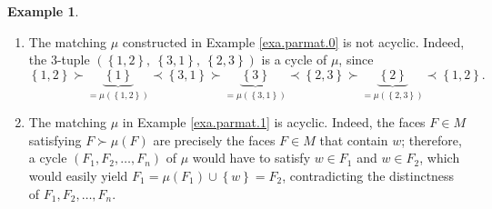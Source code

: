 \documentclass[12pt]{amsart}
\theoremstyle{definition}
\newtheorem{example}[theorem]{Example}
\begin{document}
\begin{example}
\ \ 

\begin{enumerate}
\item[(a)] The matching $\mu$ constructed in Example \ref{exa.parmat.0} is not
acyclic. Indeed, the $3$-tuple $\left(  \left\{  1,2\right\}  ,\ \left\{
3,1\right\}  ,\ \left\{  2,3\right\}  \right)  $ is a cycle of $\mu$, since%
\[
\left\{  1,2\right\}  \succ\underbrace{\left\{  1\right\}  }_{=\mu\left(
\left\{  1,2\right\}  \right)  }\prec\left\{  3,1\right\}  \succ
\underbrace{\left\{  3\right\}  }_{=\mu\left(  \left\{  3,1\right\}  \right)
}\prec\left\{  2,3\right\}  \succ\underbrace{\left\{  2\right\}  }%
_{=\mu\left(  \left\{  2,3\right\}  \right)  }\prec\left\{  1,2\right\}  .
\]


\item[(b)] The matching $\mu$ in Example \ref{exa.parmat.1} is acyclic.
Indeed, the faces $F\in M$ satisfying $F\succ\mu\left(  F\right)  $ are
precisely the faces $F\in M$ that contain $w$; therefore, a cycle $\left(
F_{1},F_{2},\ldots,F_{n}\right)  $ of $\mu$ would have to satisfy $w\in F_{1}$
and $w\in F_{2}$, which would easily yield $F_{1}=\mu\left(  F_{1}\right)
\cup\left\{  w\right\}  =F_{2}$, contradicting the distinctness of
$F_{1},F_{2},\ldots,F_{n}$.
\end{enumerate}
\end{example}
\end{document}
